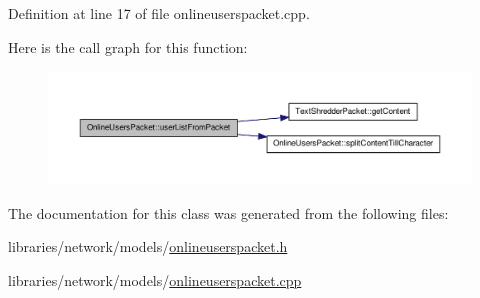 Definition at line 17 of file onlineuserspacket.cpp.



Here is the call graph for this function:\nopagebreak
\begin{figure}[H]
\begin{center}
\leavevmode
\includegraphics[width=400pt]{class_online_users_packet_a64ea4fdf646bc60af3eaac29bcd73f8d_cgraph}
\end{center}
\end{figure}




The documentation for this class was generated from the following files:\begin{DoxyCompactItemize}
\item 
libraries/network/models/\hyperlink{onlineuserspacket_8h}{onlineuserspacket.h}\item 
libraries/network/models/\hyperlink{onlineuserspacket_8cpp}{onlineuserspacket.cpp}\end{DoxyCompactItemize}

